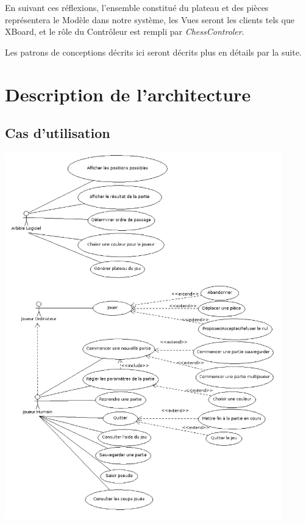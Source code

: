 \documentclass[11pt]{article}
\begin{document}
En suivant ces réflexions, l'ensemble constitué du plateau et des pièces représentera le Modèle dans notre système, les Vues seront les clients tels que XBoard, et le rôle du Contrôleur est rempli par \emph{ChessControler}.

Les patrons de conceptions décrits ici seront décrits plus en détails par la suite.
\newpage
\section{Description de l’architecture}
\label{sec-3}
\subsection{Cas d'utilisation}
\label{sec-3-1}
\includegraphics[width=0.9\textwidth]{Diagrammedecasdutilisation.png}
\end{document}
